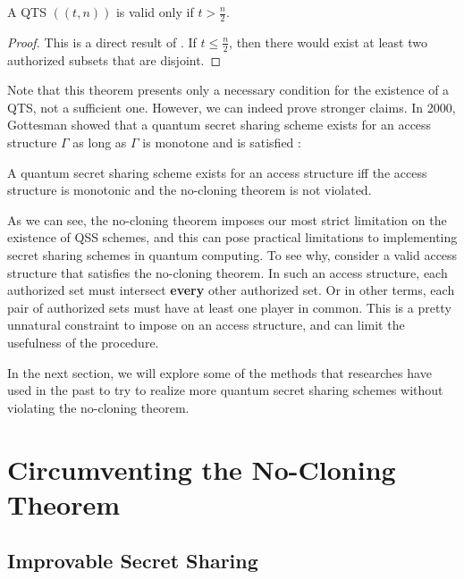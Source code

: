 \begin{corollary}
    \label{cor:qts}
    A QTS $((t,n))$ is valid only if $t > \frac{n}{2}$.
\end{corollary}

\begin{proof}
    This is a direct result of . If $t \leq \frac{n}{2}$, then there would exist at least two authorized subsets that are disjoint. 
\end{proof}

Note that this theorem presents only a necessary condition for the existence of a QTS, not a sufficient one. However, we can indeed prove stronger claims. In 2000, Gottesman showed that a quantum secret sharing scheme exists for an access structure $\Gamma$ as long as $\Gamma$ is monotone and  is satisfied \cite{gottesman_theory_2000}:

\begin{theorem}
    \label{thm:monotone-gamma}
    A quantum secret sharing scheme exists for an access structure iff the access structure is monotonic and the no-cloning theorem is not violated.
\end{theorem}

As we can see, the no-cloning theorem imposes our most strict limitation on the existence of QSS schemes, and this can pose practical limitations to implementing secret sharing schemes in quantum computing. To see why, consider a valid access structure that satisfies the no-cloning theorem. In such an access structure, each authorized set must intersect \textbf{every} other authorized set. Or in other terms, each pair of authorized sets must have at least one player in common. This is a pretty unnatural constraint to impose on an access structure, and can limit the usefulness of the procedure.

In the next section, we will explore some of the methods that researches have used in the past to try to realize more quantum secret sharing schemes without violating the no-cloning theorem.

\section{Circumventing the No-Cloning Theorem}

\subsection{Improvable Secret Sharing}
\label{ssec:improvable}


